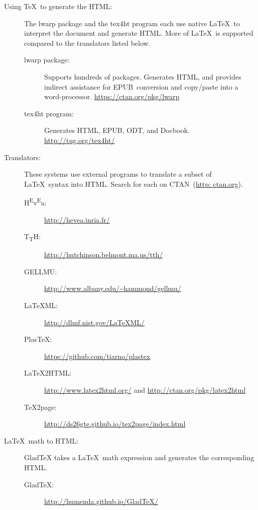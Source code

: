 \documentclass{article}
\def\CTAN{\acro{CTAN}}
\def\HTML{\acro{HTML}}
\def\EPUB{\acro{EPUB}}
\def\ODT{\acro{ODT}}
\newcommand{\acro}[1]{\textsc{\MakeLowercase{#1}}}
\def\\{ }%
\def\pkg#1{#1}%
\def\TeX{TeX}%
\def\LaTeX{LaTeX}%
\def\prog#1{\detokenize{#1}}%
\def\acro#1{#1}%
\def\HTML{HTML}%
\def\ODT{ODT}%
\def\EPUB{EPUB}%
\renewcommand*{\pkg}[1]{#1}
\renewcommand*{\prog}[1]{#1}
\renewcommand*{\TeX}{TeX}
\renewcommand*{\LaTeX}{LaTeX}
\begin{document}
\begin{description}
    \item[Using \TeX\ to generate the \HTML:]
        The \pkg{lwarp} package and the \prog{tex4ht} program
        each use native \LaTeX\ to interpret the document and generate \HTML.
        More of \LaTeX\ is supported compared to the translators listed below.
        \begin{description}
        \item [\pkg{lwarp} package:] Supports hundreds of packages.  Generates \HTML,
            and provides indirect assistance for \EPUB\ conversion and
            copy/paste into a word-processor.
            \url{https://ctan.org/pkg/lwarp}
        \item [\prog{tex4ht} program:] Generates \HTML, \EPUB, \ODT, and Docbook.
            \url{http://tug.org/tex4ht/}
        \end{description}

    \item[Translators:]
        These systems use external programs to translate a subset of \LaTeX\ syntax
        into \HTML.  Search for each on \CTAN\ (\url{http:\\ctan.org}).
        \begin{description}
        \item [H\textsuperscript{E}v\textsuperscript{E}a:] \url{http://hevea.inria.fr/}
        \item [T\textsubscript{T}H:] \url{http://hutchinson.belmont.ma.us/tth/}
        \item [GELLMU:] \url{http://www.albany.edu/~hammond/gellmu/}
        \item [\LaTeX{}ML:] \url{http://dlmf.nist.gov/LaTeXML/}
        \item [PlasTeX:] \url{https://github.com/tiarno/plastex}
        \item [\LaTeX2HTML:] \url{http://www.latex2html.org/}
                            and \url{http://ctan.org/pkg/latex2html}
        \item [\TeX2page:] \url{http://ds26gte.github.io/tex2page/index.html}
        \end{description}
    \item[\LaTeX\ math to \HTML:]
        \prog{Glad\TeX} takes a \LaTeX\ math expression and generates
        the corresponding \HTML.
        \begin{description}
        \item[\prog{Glad\TeX}:] \url{http://humenda.github.io/GladTeX/}
        \end{description}
\end{description}
\end{document}
